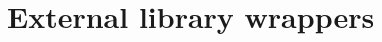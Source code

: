 \hypertarget{group__lavf__codec__wrappers}{}\section{External library wrappers}
\label{group__lavf__codec__wrappers}
